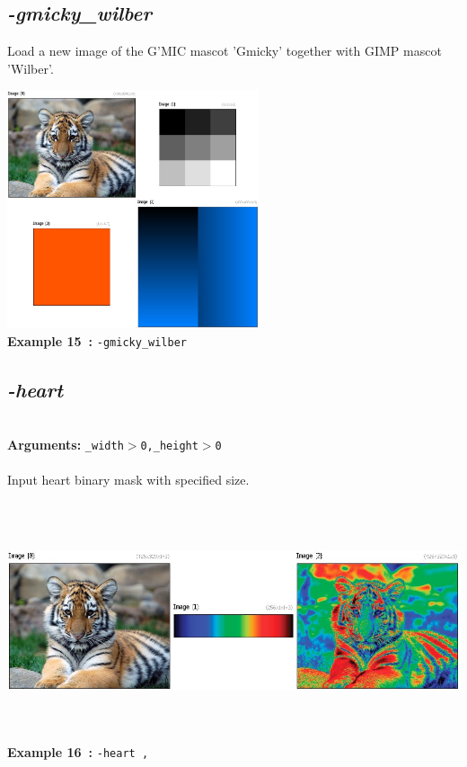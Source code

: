 \documentclass[a4paper,11pt,twoside]{book}
\begin{document}
\subsection{\emph{-gmicky\_wilber} }\vspace*{-0.5em}
Load a new image of the G'MIC mascot 'Gmicky' together with GIMP mascot 'Wilber'.
\begin{center}\includegraphics[keepaspectratio=true,height=7cm,width=\textwidth]{img/gmic_def15.jpg}\\
{\footnotesize \textbf{Example 15~:} \texttt{-gmicky\_wilber}}
\end{center}

\subsection{\emph{-heart} }\vspace*{-0.5em}
~\\\textbf{Arguments: } 
{\small \texttt{\_width$>$0,\_height$>$0}}\\~\\
Input heart binary mask with specified size.
\begin{center}\includegraphics[keepaspectratio=true,height=7cm,width=\textwidth]{img/gmic_def16.jpg}\\
{\footnotesize \textbf{Example 16~:} \texttt{-heart ,}}
\end{center}
\end{document}
